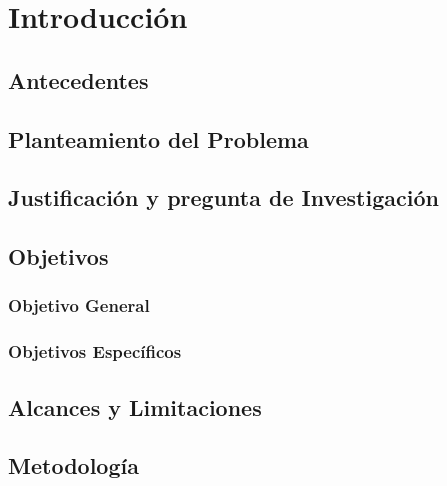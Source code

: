 \cleardoublepage %
\chapter{Introducción}





\section{Antecedentes}


\section{Planteamiento del Problema}


\section{Justificación y pregunta de Investigación}


\section{Objetivos}

\subsection{Objetivo General}

\subsection{Objetivos Específicos}


\section{Alcances y Limitaciones}


\section{Metodología}






